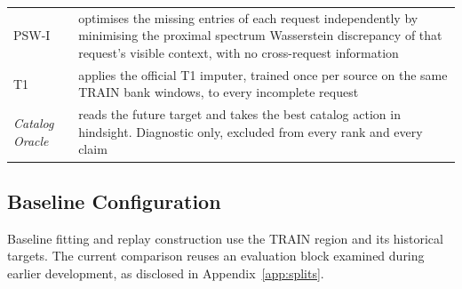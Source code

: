 \documentclass{article}
\begin{document}
\begin{table}[htbp]
\begin{tabular}{@{}l p{}@{}}
    PSW-I & optimises the missing entries of each request independently by minimising the proximal spectrum Wasserstein discrepancy of that request's visible context, with no cross-request information \\
    T1 & applies the official T1 imputer, trained once per source on the same TRAIN bank windows, to every incomplete request \\
    \emph{Catalog Oracle} & reads the future target and takes the best catalog action in hindsight. Diagnostic only, excluded from every rank and every claim \\
    \bottomrule
  \end{tabular}
\end{table}

\subsection{Baseline Configuration}
\label{app:baseline-config}
Baseline fitting and replay construction use the TRAIN region and its historical targets.
The current comparison reuses an evaluation block examined during earlier development, as
disclosed in Appendix~\ref{app:splits}.
\end{document}
